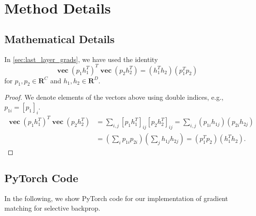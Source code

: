\documentclass{article}
\newcommand{\R}{\mathbf{R}}
\DeclareMathOperator{\vectorize}{\mathbf{vec}}
\theoremstyle{plain}
\theoremstyle{definition}
\theoremstyle{remark}
\begin{document}
\section{Method Details}
\label{app:method_details}

\subsection{Mathematical Details}
In \textsection\ref{sec:last_layer_grads}, we have used the identity
\begin{equation}
    \vectorize(p_1 h_1^T)^T \vectorize(p_2 h_2^T) = (h_1^T h_2) (p_1^T p_2)
\end{equation}
for $p_1, p_2\in\R^C$ and $h_1, h_2\in\R^D$.

\begin{proof}
We denote elements of the vectors above using double indices, e.g., $p_{1i} = [p_1]_i$.
\begin{equation}
    \begin{split}
        \vectorize(p_1h_1^T)^T \vectorize(p_2h_2^T) & = \sum_{i, j} [p_1h_1^T]_{ij} [p_2h_2^T]_{ij} = \sum_{i, j} (p_{1i}h_{1j})(p_{2i}h_{2j}) \\
        & = \left( \sum_i p_{1i}p_{2i} \right)\left( \sum_j h_{1j}h_{2j} \right) = (p_1^Tp_2)(h_1^T h_2).
    \end{split}
\end{equation}
\end{proof}

\subsection{PyTorch Code}
\label{app:code}

In the following, we show PyTorch code for our implementation of gradient matching for selective backprop.
\end{document}
